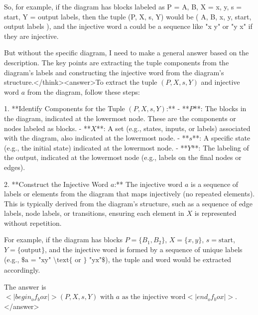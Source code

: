 So, for example, if the diagram has blocks labeled as P = {A, B}, X = {x, y}, s = start, Y = {output labels}, then the tuple (P, X, s, Y) would be ( {A, B}, {x, y}, start, {output labels} ), and the injective word a could be a sequence like "x y" or "y x" if they are injective.

But without the specific diagram, I need to make a general answer based on the description. The key points are extracting the tuple components from the diagram's labels and constructing the injective word from the diagram's structure.</think><answer>To extract the tuple \((P, X, s, Y)\) and injective word \(a\) from the diagram, follow these steps:  

1. **Identify Components for the Tuple \((P, X, s, Y)\):**  
   - **\(P\)**: The blocks in the diagram, indicated at the lowermost node. These are the components or nodes labeled as blocks.  
   - **\(X\)**: A set (e.g., states, inputs, or labels) associated with the diagram, also indicated at the lowermost node.  
   - **\(s\)**: A specific state (e.g., the initial state) indicated at the lowermost node.  
   - **\(Y\)**: The labeling of the output, indicated at the lowermost node (e.g., labels on the final nodes or edges).  

2. **Construct the Injective Word \(a\):**  
   The injective word \(a\) is a sequence of labels or elements from the diagram that maps injectively (no repeated elements). This is typically derived from the diagram’s structure, such as a sequence of edge labels, node labels, or transitions, ensuring each element in \(X\) is represented without repetition.  

For example, if the diagram has blocks \(P = \{B_1, B_2\}\), \(X = \{x, y\}\), \(s = \text{start}\), \(Y = \{\text{output}\}\), and the injective word is formed by a sequence of unique labels (e.g., \(a = "xy" \text{ or } "yx"\)), the tuple and word would be extracted accordingly.  

The answer is \(<|begin_of_box|>(P, X, s, Y) \text{ with } a \text{ as the injective word}<|end_of_box|>\).</answer>
